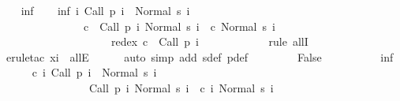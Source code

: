 \begin{isabellebody}
\ \ \isamarkupfalse%
\ inf\isanewline
\ \ \isamarkupfalse%
\ inf{\isacharprime}{\isacharcolon}\ {\isachardoublequoteopen}{\isasymforall}i{\isachardot}\ {\isasymGamma}{\isasymturnstile}Call\ {\isacharparenleft}p\ i{\isacharparenright}\ {\isasymdown}\ Normal\ {\isacharparenleft}s\ i{\isacharparenright}\ {\isasymand}\isanewline
\ \ \ \ \ \ \ \ \ \ \ \ \ \ \ {\isacharparenleft}{\isasymexists}c{\isachardot}\ {\isasymGamma}{\isasymturnstile}\ {\isacharparenleft}Call\ {\isacharparenleft}p\ i{\isacharparenright}{\isacharcomma}\ Normal\ {\isacharparenleft}s\ i{\isacharparenright}{\isacharparenright}\ {\isasymrightarrow}\isactrlsup {\isacharplus}\ {\isacharparenleft}c{\isacharcomma}\ Normal\ {\isacharparenleft}s\ {\isacharparenleft}i{\isacharplus}{}{\isacharparenright}{\isacharparenright}{\isacharparenright}\ {\isasymand}\ \isanewline
\ \ \ \ \ \ \ \ \ \ \ \ \ \ \ \ \ \ \ \ redex\ c\ {\isacharequal}\ Call\ {\isacharparenleft}p\ {\isacharparenleft}i{\isacharplus}{}{\isacharparenright}{\isacharparenright}{\isacharparenright}{\isachardoublequoteclose}\isanewline
\ \ \ \ \isamarkupfalse%
\ {\isacharminus}\isanewline
\ \ \ \ \isamarkupfalse%
\ {\isacharparenleft}rule\ allI{\isacharparenright}\isanewline
\ \ \ \ \isamarkupfalse%
\ {\isacharparenleft}erule{\isacharunderscore}tac\ x{\isacharequal}i\ \ allE{\isacharparenright}\isanewline
\ \ \ \ \isamarkupfalse%
\ {\isacharparenleft}auto\ simp\ add{\isacharcolon}\ s{\isacharunderscore}def\ p{\isacharunderscore}def{\isacharparenright}\isanewline
\ \ \ \ \isamarkupfalse%
\isanewline
\ \ \isamarkupfalse%
\ False\isanewline
\ \ \isamarkupfalse%
\ {\isacharminus}\isanewline
\ \ \ \ \isamarkupfalse%
\ inf{\isacharprime}\isanewline
\ \ \ \ \isamarkupfalse%
\ {\isachardoublequoteopen}{\isasymexists}c{\isachardot}\ {\isasymforall}i{\isachardot}\ {\isasymGamma}{\isasymturnstile}Call\ {\isacharparenleft}p\ i{\isacharparenright}\ {\isasymdown}\ Normal\ {\isacharparenleft}s\ i{\isacharparenright}\ {\isasymand}\isanewline
\ \ \ \ \ \ \ \ \ \ \ \ \ \ \ {\isasymGamma}{\isasymturnstile}\ {\isacharparenleft}Call\ {\isacharparenleft}p\ i{\isacharparenright}{\isacharcomma}\ Normal\ {\isacharparenleft}s\ i{\isacharparenright}{\isacharparenright}\ {\isasymrightarrow}\isactrlsup {\isacharplus}\ {\isacharparenleft}c\ i{\isacharcomma}\ Normal\ {\isacharparenleft}s\ {\isacharparenleft}i{\isacharplus}{}{\isacharparenright}{\isacharparenright}{\isacharparenright}\ {\isasymand}\ \isanewline

\end{isabellebody}
